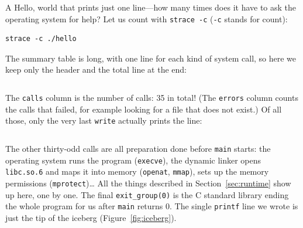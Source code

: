 A Hello, world that prints just one line---how many times does it have to ask the operating system for help? Let us count with \texttt{strace -c} (\texttt{-c} stands for count):
\begin{verbatim}
strace -c ./hello
\end{verbatim}
The summary table is long, with one line for each kind of system call, so here we keep only the header and the total line at the end:
\inputminted[linenos=false]{text}{code/en/ch05/out/strace_hello_count.txt}

The \texttt{calls} column is the number of calls: 35 in total! (The \texttt{errors} column counts the calls that failed, for example looking for a file that does not exist.) Of all those, only the very last \texttt{write} actually prints the line:
\inputminted[linenos=false]{text}{code/en/ch05/out/strace_hello_tail.txt}

The other thirty-odd calls are all preparation done before \texttt{main} starts: the operating system runs the program (\texttt{execve}), the dynamic linker opens \texttt{libc.so.6} and maps it into memory (\texttt{openat}, \texttt{mmap}), sets up the memory permissions (\texttt{mprotect})\ldots{} All the things described in Section~\ref{sec:runtime} show up here, one by one. The final \texttt{exit\_group(0)} is the C standard library ending the whole program for us after \texttt{main} returns 0. The single \texttt{printf} line we wrote is just the tip of the iceberg (Figure~\ref{fig:iceberg}).

